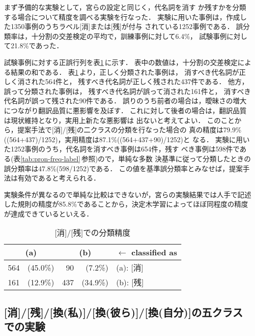 まず予備的な実験として，宮ら\cite{Miya00}の設定と同じく，代名詞を消す
か残すかを分類する場合について精度を調べる実験を行なった．
実験に用いた事例は，作成した1350事例のうちラベル[消]または[残]が付与
されている1252事例である．
誤分類率は，十分割の交差検定の平均で，訓練事例に対して6.4\%，
試験事例に対して21.8\%であった．

試験事例に対する正誤行列を表\ref{tab:confusion_matrix1}\,に示す．
表中の数値は，十分割の交差検定による結果の和である．
表\ref{tab:confusion_matrix1}\,より，正しく分類された事例は，
消すべき代名詞が正しく消された564件と，
残すべき代名詞が正しく残された437件である．
他方，誤って分類された事例は，
残すべき代名詞が誤って消された161件と，
消すべき代名詞が誤って残された90件である．
誤りのうち前者の場合は，曖昧さの増大につながり翻訳品質に悪影響を及ぼす．
これに対して後者の場合は，翻訳品質は現状維持となり，実用上新たな悪影響は
出ないと考えてよい．
このことから，提案手法で[消]/[残]の二クラスの分類を行なった場合の
真の精度は79.9\%((564+437)/1252)，実用精度は87.1\%((564+437+90)/1252)と
なる．
実験に用いた1252事例のうち，代名詞を消すべき事例は654件，残す
べき事例は598件である(表\ref{tab:pron-freq-label}\,参照)ので，単純な多数
決基準に従って分類したときの誤分類率は47.8\%(598/1252)である．
この値を基準誤分類率とみなせば，提案手法は有効であると考えられる．

実験条件が異なるので単純な比較はできないが，宮らの実験結果では人手で記述
した規則の精度が85.8\%であることから，決定木学習によってほぼ同程度の精度
が達成できているといえる．
\begin{table}[htbp]
\caption{[消]/[残]での分類精度}
\label{tab:confusion_matrix1}
\begin{center}
\begin{tabular}{|rr|rr|l|}\hline
\multicolumn{2}{|c|}{(a)} & \multicolumn{2}{c|}{(b)} & $\leftarrow$ classified as \\\hline\hline
 564 & (45.0\%) &  90 &  (7.2\%) & (a): [消] \\
 161 & (12.9\%) & 437 & (34.9\%) & (b): [残] \\\hline
\end{tabular}
\end{center}
\end{table}

\vspace{6pt}

\subsection{[消]/[残]/[換(私)]/[換(彼ら)]/[換(自分)]の五クラスでの実験}
\label{sec:experiment:trinary}

